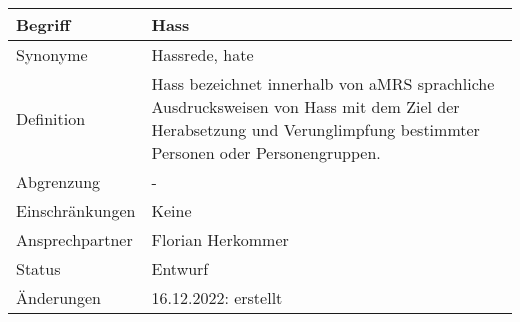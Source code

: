 \begin{table}[H]
    \centering
    \label{gls:hass}
    \begin{tabularx}{\textwidth}{| l | X |}
        \hline
        Begriff         & Hass                                                                                                                                                               \\
        \hline
        Synonyme        & Hassrede, hate                                                                                                                                                     \\
        \hline
        Definition      & Hass bezeichnet innerhalb von aMRS sprachliche Ausdrucksweisen von Hass mit dem Ziel der Herabsetzung und Verunglimpfung bestimmter Personen oder Personengruppen. \\
        \hline
        Abgrenzung      & -                                                                                                                                                                  \\
        \hline
        Einschränkungen & Keine                                                                                                                                                              \\
        \hline
        Ansprechpartner & Florian Herkommer                                                                                                                                                  \\
        \hline
        Status          & Entwurf                                                                                                                                                            \\
        \hline
        Änderungen      & 16.12.2022: erstellt                                                                                                                                               \\
        \hline
    \end{tabularx}
\end{table}


